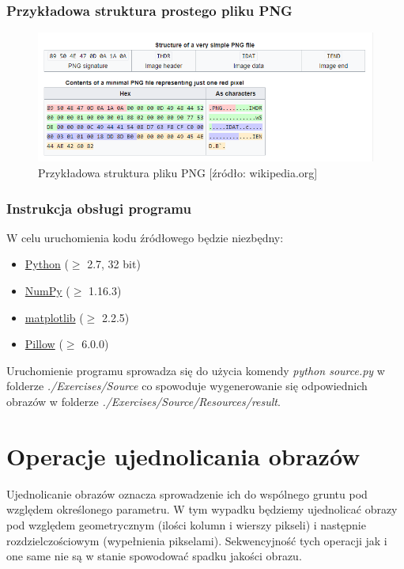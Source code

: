 \documentclass[a4paper,12pt]{book}
\begin{document}
\subsection*{Przykładowa struktura prostego pliku PNG}
\begin{figure}[H]
	\includegraphics[width=1\textwidth]{./overview/examplePNG.png}
	\caption{Przykładowa struktura pliku PNG [źródło: wikipedia.org]}
\end{figure}

\subsection{Instrukcja obsługi programu}
W celu uruchomienia kodu źródłowego będzie niezbędny: 
\begin{itemize}
	\item \href{https://www.python.org/}{Python} ($\geq$ 2.7, 32 bit)
	\item \href{https://numpy.org/}{NumPy} ($\geq$ 1.16.3)
	\item \href{https://matplotlib.org/}{matplotlib} ($\geq$ 2.2.5)
	\item \href{https://pillow.readthedocs.io/en/stable/}{Pillow} ($\geq$ 6.0.0)
\end{itemize}
Uruchomienie programu sprowadza się do użycia komendy \textit{python source.py} w folderze \textit{./Exercises/Source} co spowoduje wygenerowanie się odpowiednich obrazów w folderze \textit{./Exercises/Source/Resources/result}. 

\chapter{Operacje ujednolicania obrazów}
Ujednolicanie obrazów oznacza sprowadzenie ich do wspólnego gruntu pod względem określonego parametru. W tym wypadku będziemy ujednolicać obrazy pod względem geometrycznym (ilości kolumn i wierszy pikseli) i następnie rozdzielczościowym (wypełnienia pikselami). Sekwencyjność tych operacji jak i one same nie są w stanie spowodować spadku jakości obrazu. 
\end{document}

